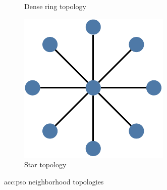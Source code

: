 \begin{figure}[t]
\begin{subfigure}[t]{0.3\textwidth}
        \caption{Dense ring topology}
        \label{fig:topologydensering}
    \end{subfigure}
    \hfill
    \begin{subfigure}[t]{0.3\textwidth}
        \includegraphics[width=\textwidth]{img/master_neigh_star.pdf}
        \caption{Star topology}
        \label{fig:topologystar}
    \end{subfigure}
    \caption{\acrshort*{acc:pso} neighborhood topologies}
\end{figure}

